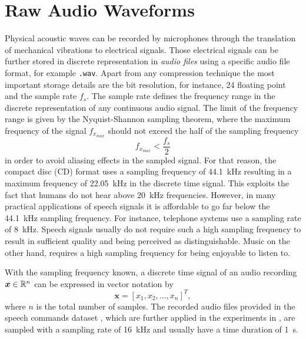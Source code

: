 
\section{Raw Audio Waveforms}\label{sec:signal_raw}
Physical acoustic waves can be recorded by microphones through the translation of mechanical vibrations to electrical signals. 
Those electrical signals can be further stored in discrete representation in \emph{audio files} using a specific audio file format, for example \texttt{.wav}.
Apart from any compression technique the most important storage details are the bit resolution, for instance, \SI{24}{\bit} floating point and the sample rate $f_s$.
The sample rate defines the frequency range in the discrete representation of any continuous audio signal.
The limit of the frequency range is given by the Nyquist-Shannon sampling theorem, where the maximum frequency of the signal $f_{x_{max}}$ should not exceed the half of the sampling frequency
\begin{equation}\label{eq:signal_raw_nyquist}
  f_{x_{max}} < \frac{f_s}{2}
\end{equation}
in order to avoid aliasing effects in the sampled signal.
For that reason, the compact disc (CD) format uses a sampling frequency of \SI{44.1}{\kilo\hertz} resulting in a maximum frequency of \SI{22.05}{\kilo\hertz} in the discrete time signal.
This exploits the fact that humans do not hear above \SI{20}{\kilo\hertz} frequencies.
However, in many practical applications of speech signals it is affordable to go far below the \SI{44.1}{\kilo\hertz} sampling frequency. 
For instance, telephone systems use a sampling rate of \SI{8}{\kilo\hertz}.
Speech signals usually do not require such a high sampling frequency to result in sufficient quality and being perceived as distinguishable.
Music on the other hand, requires a high sampling frequency for being enjoyable to listen to.

With the sampling frequency known, a discrete time signal of an audio recording $\bm{x} \in \mathbb{R}^n$ can be expressed in vector notation by
\begin{equation}\label{eq:signal_raw_x}
  \bm{x} = [x_1, x_2, \dots, x_n]^T,
\end{equation}
where $n$ is the total number of samples.
The recorded audio files provided in the speech commands dataset \cite{Warden2018SpeechCommands}, which are further applied in the experiments in , are sampled with a sampling rate of \SI{16}{\kilo\hertz} and usually have a time duration of \SI{1}{\second}.

